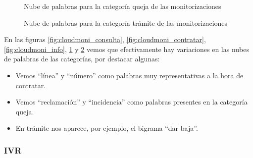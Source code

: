        \begin{figure}[!ht]
           	\centering
           	
           	
               \caption{Nube de palabras para la categoría queja de las monitorizaciones}
               \label{fig:cloudmoni_queja}
           \end{figure}     
    
    
    \begin{figure}[!ht]
               	\centering
               	
               	
                   \caption{Nube de palabras para la categoría trámite de las monitorizaciones}
                   \label{fig:cloudmoni_tram}
 \end{figure}     
    
   
   En las figuras \ref{fig:cloudmoni_consulta}, \ref{fig:cloudmoni_contratar}, \ref{fig:cloudmoni_info}, \ref{fig:cloudmoni_queja} y \ref{fig:cloudmoni_tram} vemos que efectivamente hay variaciones en las nubes de palabras de las
categorías, por destacar algunas:
\begin{itemize}
\item Vemos ``línea'' y ``número'' como palabras muy representativas a la hora
de contratar.

\item Vemos ``reclamación'' y ``incidencia'' como palabras presentes en la
categoría queja.

\item En trámite nos aparece, por ejemplo, el bigrama ``dar baja''.
\end{itemize}

\FloatBarrier
\subsubsection{IVR}

